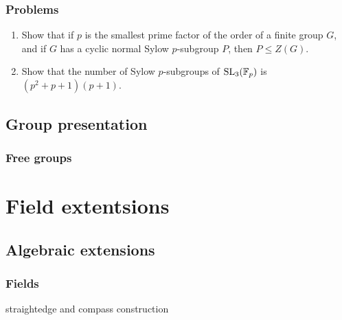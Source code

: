 \documentclass{../../large}
\begin{document}
\section*{Problems}
\begin{enumerate}
\item Show that if $p$ is the smallest prime factor of the order of a finite group $G$, and if $G$ has a cyclic normal Sylow $p$-subgroup $P$, then $P\le Z(G)$.
\item Show that the number of Sylow $p$-subgroups of $\mathrm{SL}_3(\mathbb{F}_p)$ is $(p^2+p+1)(p+1)$.
\end{enumerate}




\chapter{Group presentation}

\section{Free groups}










\part{Field extentsions}

\chapter{Algebraic extensions}

\section{Fields}
\begin{prb}
\end{prb}
\begin{prb}
\end{prb}
\begin{prb}
\end{prb}
\begin{prb}
\end{prb}
straightedge and compass construction
\end{document}
